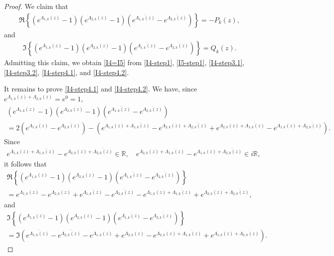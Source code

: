 \documentclass[10pt,a4paper]{amsart}
\newcommand{\mR}{\mathbb{R}}
\begin{document}
\begin{proof}
We claim that    
\begin{align}	\label{I4-step4.1} 
  \Re \left\{ \left(e^{\Lambda_{1,k}(z)} - 1 \right) \left(e^{\Lambda_{2,k}(z)} - 1 \right) \left(e^{\overline{\Lambda_{1,k}(z)}} - e^{\overline{\Lambda_{2,k}(z)}} \right) \right\} = - P_k(z), 
\end{align}     
and	
\begin{align}	\label{I4-step4.2}
\Im \left\{ \left(e^{\Lambda_{1,k}(z)} - 1 \right) \left(e^{\Lambda_{2,k}(z)} - 1 \right) \left(e^{\overline{\Lambda_{1,k}(z)}} - e^{\overline{\Lambda_{2,k}(z)}} \right)  \right\} = Q_k(z).
\end{align}
Admitting this claim, we obtain \eqref{I4=I5} from \eqref{I4-step1}, \eqref{I5-step1}, \eqref{I4-step3.1}, \eqref{I4-step3.2}, \eqref{I4-step4.1}, and \eqref{I4-step4.2}.

\medskip

    It remains to prove \eqref{I4-step4.1} and \eqref{I4-step4.2}. We have, since $e^{\Lambda_{1,k}(z) + \Lambda_{2,k}(z)} = e^0 = 1$, 
    \begin{multline*}
         \left(e^{\Lambda_{1,k}(z)} - 1 \right) \left(e^{\Lambda_{2,k}(z)} - 1 \right) \left(e^{\overline{\Lambda_{1,k}(z)}} - e^{\overline{\Lambda_{2,k}(z)}} \right) \\
        = 2 \left(e^{\overline{\Lambda_{1,k}(z)}} - e^{\overline{\Lambda_{2,k}(z)}} \right) - \left(e^{\Lambda_{1,k}(z) + \overline{\Lambda_{1,k}(z)}} - e^{\Lambda_{2,k}(z) + \overline{\Lambda_{2,k}(z)}} + e^{\Lambda_{2,k}(z) + \overline{\Lambda_{1,k}(z)}} - e^{\Lambda_{1,k}(z) + \overline{\Lambda_{2,k}(z)}}\right). 
    \end{multline*}
Since
    \begin{align*}
    	e^{\Lambda_{1,k}(z) + \overline{\Lambda_{1,k}(z)}} - e^{\Lambda_{2,k}(z) + \overline{\Lambda_{2,k}(z)}}  \in \mR, \quad  e^{\Lambda_{2,k}(z) + \overline{\Lambda_{1,k}(z)}} - e^{\Lambda_{1,k}(z) + \overline{\Lambda_{2,k}(z)}} \in i \mR, 
    \end{align*}
it follows that
\begin{multline}\label{I4I5-p1}
        \Re \left\{ \left(e^{\Lambda_{1,k}(z)} - 1 \right) \left(e^{\Lambda_{2,k}(z)} - 1 \right) \left(e^{\overline{\Lambda_{1,k}(z)}} - e^{\overline{\Lambda_{2,k}(z)}} \right) \right\} \\ = e^{\Lambda_{1,k}(z)} - e^{\Lambda_{2,k}(z)} + e^{\overline{\Lambda_{1,k}(z)}} - e^{\overline{\Lambda_{2,k}(z)}}  - e^{\Lambda_{1,k}(z) + \overline{\Lambda_{1,k}(z)}} + e^{\Lambda_{2,k}(z) + \overline{\Lambda_{2,k}(z)}},  
    \end{multline}
    and
    \begin{multline}\label{I4I5-p2}
          \Im \left\{ \left(e^{\Lambda_{1,k}(z)} - 1 \right) \left(e^{\Lambda_{2,k}(z)} - 1 \right) \left(e^{\overline{\Lambda_{1,k}(z)}} - e^{\overline{\Lambda_{2,k}(z)}} \right)  \right\} \\[6pt]
          = \Im \left( e^{\overline{\Lambda_{1,k}(z)}} - e^{\overline{\Lambda_{2,k}(z)}} - e^{\Lambda_{1,k}(z)} + e^{\Lambda_{2,k}(z)} - e^{\Lambda_{2,k}(z) + \overline{\Lambda_{1,k}(z)}} + e^{\Lambda_{1,k}(z) + \overline{\Lambda_{2,k}(z)}} \right). 
    \end{multline}  
    

\end{proof}
\end{document}
